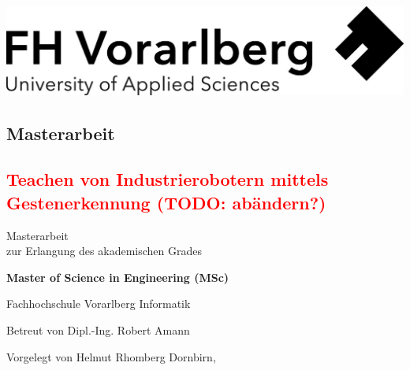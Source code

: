 \documentclass[a4paper,12pt, twoside]{scrreprt}
\begin{document}
\cleardoublepage   %
\thispagestyle{empty}
\begin{titlepage}
  \begin{flushright}
  \includegraphics[width=0.4\linewidth]{Logo-A3}
  \end{flushright}
  \begin{flushleft}
  \section*{Masterarbeit} %
  \subsection*{\textcolor{red}{Teachen von Industrierobotern mittels Gestenerkennung (TODO: abändern?)}}
  \vspace{1cm}
  
  Masterarbeit\\
  zur Erlangung des akademischen Grades
  \vspace{0.5cm}
  
  \textbf{Master of Science in Engineering (MSc)} %

  \vspace{1cm}
  Fachhochschule Vorarlberg\newline
  Informatik %

  \vspace{0.5cm}
  
  Betreut von\newline
  Dipl.-Ing. Robert Amann %
  
  \vspace{0.5cm}
  
  Vorgelegt von\newline
  Helmut Rhomberg\newline\newline %
  Dornbirn, \todayWithoutDay %
  \end{flushleft}
\end{titlepage}
\end{document}
